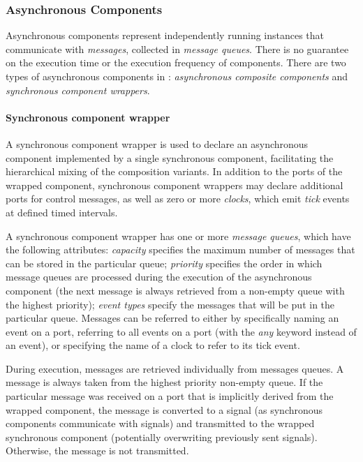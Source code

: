 
\subsubsection{Asynchronous Components}
Asynchronous components represent independently running instances that communicate with \emph{messages}, collected in \emph{message queues}. There is no guarantee on the execution time or the execution frequency of components. 
There are two types of asynchronous components in \gamma: \emph{asynchronous composite components} and \emph{synchronous component wrappers}.

\paragraph{Synchronous component wrapper} A synchronous component wrapper is used to declare an asynchronous component implemented by a single synchronous component, facilitating the hierarchical mixing of the composition variants. In addition to the ports of the wrapped component, synchronous component wrappers may declare additional ports for control messages, as well as zero or more \emph{clocks}, which emit \emph{tick} events at defined timed intervals.

A synchronous component wrapper has one or more
\emph{message queues}, which have the following attributes: \emph{capacity} specifies the maximum number of messages that can be stored in the particular	queue; \emph{priority} specifies the order in which message queues are processed during 	the execution of the asynchronous component (the next message is always retrieved from a non-empty queue with the highest priority); \emph{event types} specify the messages that will be put in the particular queue. Messages can be referred to either by specifically naming an event on a port, referring to all events on a port (with the \emph{any} keyword instead of an event), or specifying the name of a clock to refer to its tick event.

During execution, messages are retrieved individually from messages queues. A message
is always taken from the highest priority non-empty queue. If the particular message was
received on a port that is implicitly derived from the wrapped component, the message is
converted to a signal (as synchronous components communicate with signals) and transmitted
to the wrapped synchronous component (potentially overwriting previously sent signals). Otherwise, the message is not transmitted.

